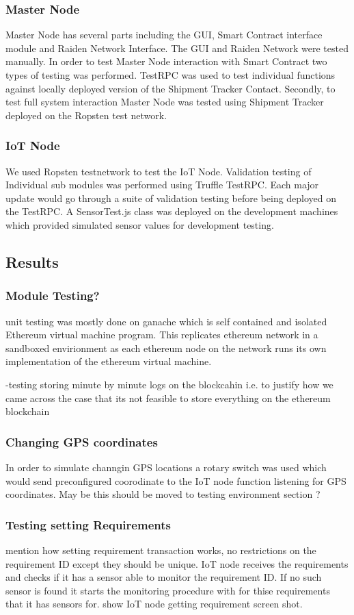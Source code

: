 \subsubsection{Master Node}
Master Node has several parts including the GUI, Smart Contract interface module and Raiden Network Interface. The GUI and Raiden Network were tested manually. In order to test Master Node interaction with Smart Contract two types of testing was performed. TestRPC was used to test individual functions against locally deployed version of the Shipment Tracker Contact. Secondly, to test full system interaction Master Node was tested using Shipment Tracker deployed on the Ropsten test network.
\subsubsection{IoT Node}
We used Ropsten testnetwork to test the IoT Node. Validation testing of Individual sub modules was performed using Truffle TestRPC. Each major update would go through a suite of validation testing before being deployed on the TestRPC. A SensorTest.js class was deployed on the development machines which provided simulated sensor values for development testing. 
\subsection{Results}
\subsubsection{Module Testing?} \label{UnitTesting} 
unit testing was mostly done on ganache which is self contained and isolated Ethereum virtual machine program. This replicates ethereum network in a sandboxed envirionment as each ethereum node on the network runs its own implementation of the ethereum virtual machine.

-testing storing minute by minute logs on the blockcahin i.e. to justify how we came across the case that its not feasible to store everything on the ethereum blockchain


\subsubsection{Changing GPS coordinates}
In order to simulate channgin GPS locations a rotary switch was used which would send preconfigured coorodinate to the IoT node function listening for GPS coordinates. May be this should be moved to testing environment section ?
\subsubsection{Testing setting Requirements}
mention how setting requirement transaction works, no restrictions on the requirement ID except they should be unique. IoT node receives the requirements and checks if it has a sensor able to monitor the requirement ID. If no such sensor is found it starts the monitoring procedure with for thise requirements that it has sensors for. show IoT node getting requirement screen shot.
